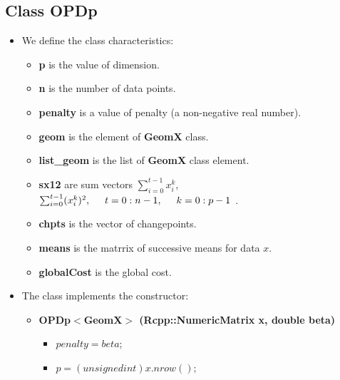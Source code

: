 \documentclass{report}
\begin{document}
	
	\subsection*{Class OPDp}
	\label{OPDp}
	
	\begin{itemize}
		\item We define the class characteristics: 
		
		\begin{itemize}
			\item {\bfseries p} is the value of dimension.
			
			\item {\bfseries n} is the number of data points.
			
			\item {\bfseries penalty} is a value of penalty (a non-negative real number).
			
			\item {\bfseries geom} is the element of   {\bfseries GeomX} class.
			
			\item {\bfseries list\_geom} is the list of  {\bfseries GeomX}  class element.
			
			\item {\bfseries sx12} are sum vectors $\sum_{i=0}^{t-1}x^k_i$,  $\sum_{i=0}^{t-1} (x^k_i)^2,  \hspace*{5mm}  t = 0:n-1,  \hspace*{5mm}  k = 0:p-1$ .
			
			\item {\bfseries chpts} is the vector of changepoints.
			
			\item {\bfseries means} is the matrrix of successive means for data  $x$.
			
			\item {\bfseries globalCost} is the global cost.
				
		\end{itemize}
		
		\item The class implements the constructor:
		
		\begin{itemize}
			\item {\bfseries  OPDp$<$GeomX$>$ (Rcpp::NumericMatrix x, double beta)}
			\begin{itemize}
				\item $penalty = beta$;
				
				\item $p = (unsigned int)x.nrow();$
				

\end{itemize}
\end{itemize}
\end{itemize}
\end{document}
